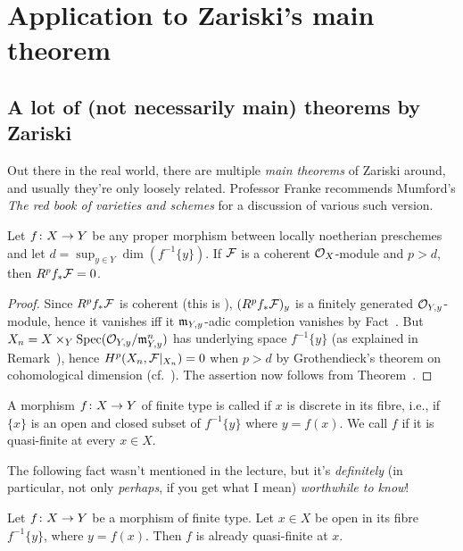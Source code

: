 \documentclass[a4paper,parskip=half,numbers=enddot, DIV=12]{scrreprt}
\begin{document}
\section{Application to Zariski's main theorem}
\subsection{A lot of (not necessarily main) theorems by Zariski}
Out there in the real world, there are multiple \emph{main theorems} of Zariski around, and usually they're only loosely related. Professor Franke recommends Mumford's \emph{The red book of varieties and schemes} for a discussion of various such version.
\begin{cor}
	Let $f\colon X\morphism Y$ be any proper morphism between locally noetherian preschemes and let $d=\sup_{y\in Y}\dim \left(f^{-1}\{y\}\right)$. If $\mathcal{F}$ is a coherent $\mathcal{O}_X$-module and $p>d$, then $R^pf_*\mathcal{F}=0$.
\end{cor}
\begin{proof}
	Since $R^pf_*\mathcal{F}$ is coherent (this is \cite[Theorem~5]{alggeo2}), $(R^pf_*\mathcal{F})_y$ is a finitely generated $\mathcal{O}_{Y,y}$-module, hence it vanishes iff it $\mathfrak{m}_{Y,y}$-adic completion vanishes by Fact~. But $X_n=X\times_Y\operatorname{Spec} (\mathcal{O}_{Y,y}/\mathfrak{m}_{Y,y}^n)$ has underlying space $f^{-1}\{y\}$ (as explained in Remark~), hence $H^p(X_n,\mathcal{F}|_{X_n})=0$ when $p>d$ by Grothendieck's theorem on cohomological dimension (cf.\ \cite[Proposition~1.4.1]{alggeo2}). The assertion now follows from Theorem~.
\end{proof}
\begin{defi}
	A morphism $f\colon X\morphism Y$ of finite type is called  if $x$ is discrete in its fibre, i.e., if $\{x\}$ is an open and closed subset of $f^{-1}\{y\}$ where $y=f(x)$. We call $f$  if it is quasi-finite at every $x\in X$. 
\end{defi}
The following fact wasn't mentioned in the lecture, but it's \emph{definitely} (in particular, not only \emph{perhaps}, if you get what I mean) \emph{worthwhile to know}!
\begin{fact}
	Let $f\colon X\morphism Y$ be a morphism of finite type. Let $x\in X$ be open in its fibre $f^{-1}\{y\}$, where $y=f(x)$. Then $f$ is already quasi-finite at $x$. 
\end{fact}
\end{document}
